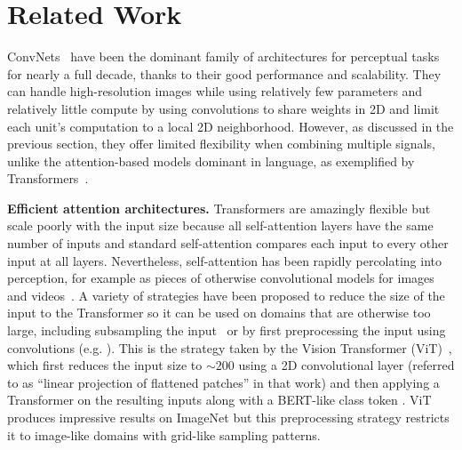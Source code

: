\section{Related Work}
\label{sec:related}

ConvNets~\cite{fukushima1980selforganizing, lecun1998gradient, ciresan2011highperformance, krizhevsky2012imagenet} have been the dominant family of architectures for perceptual tasks for nearly a full decade, thanks to their good performance and scalability. They can handle high-resolution images while using relatively few parameters and relatively little compute by using convolutions to share weights in 2D and limit each unit's computation to a local 2D neighborhood. However, as discussed in the previous section, they offer limited flexibility when combining multiple signals, unlike the attention-based models dominant in language, as exemplified by Transformers~\cite{vaswani2017attention}.

 \textbf{Efficient attention architectures.}  Transformers are amazingly flexible but scale poorly with the input size because all self-attention layers have the same number of inputs and standard self-attention compares each input to every other input at all layers. Nevertheless, self-attention has been rapidly percolating into perception, for example as pieces of otherwise convolutional models for images~\cite{bello2019attention,cordonnier2019relationship, srinivas2021bottleneck} and videos~\cite{wang2018non,girdhar2019video}. A variety of strategies have been proposed to reduce the size of the input to the Transformer so it can be used on domains that are otherwise too large, including subsampling the input~\cite{chen2020generative} or by first preprocessing the input using convolutions (e.g. \citealt{wu2020visual}). This is the strategy taken by the Vision Transformer (ViT)~\cite{dosovitskiy2020image}, which first reduces the input size to $\sim 200$ using a 2D convolutional layer (referred to as ``linear projection of flattened patches'' in that work) and then applying a Transformer on the resulting inputs along with a BERT-like class token \cite{devlin2018bert}. ViT produces impressive results on ImageNet but this preprocessing strategy restricts it to image-like domains with grid-like sampling patterns. 

